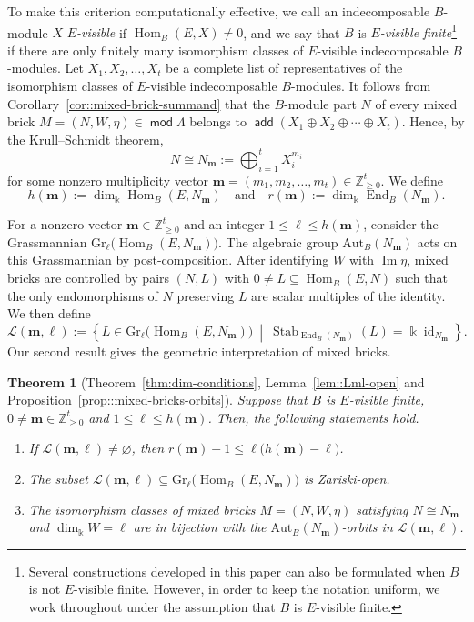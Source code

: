 \documentclass[a4,12pt]{amsart}
\numberwithin{equation}{section} %
\def\Hom{\operatorname{Hom}} %
\def\End{\operatorname{End}} %
\def\Im{\operatorname{Im}} %
\def\Stab{\operatorname{Stab}} %
\def\add{\operatorname{\mathsf{add}}}
\def\mod{\operatorname{\mathsf{mod}}}
\def\Gr{\mathrm{Gr}} %
\def\Aut{\mathrm{Aut}} %
\newtheorem{theorem*}{Theorem} %
\theoremstyle{definition} %
\begin{document}
To make this criterion computationally effective, we call an indecomposable $B$-module $X$ \emph{$E$-visible} if $\Hom_B(E,X)\neq0$, and we say that $B$ is \emph{$E$-visible finite}\footnote{Several constructions developed in this paper can also be formulated when $B$ is not $E$-visible finite. However, in order to keep the notation uniform, we work throughout under the assumption that $B$ is $E$-visible finite.} if there are only finitely many isomorphism classes of $E$-visible indecomposable $B$-modules. Let $X_1,X_2,\ldots,X_t$ be a complete list of representatives of the isomorphism classes of $E$-visible indecomposable $B$-modules. It follows from Corollary~\ref{cor::mixed-brick-summand} that the $B$-module part $N$ of every mixed brick $M=(N,W,\eta)\in\mod \Lambda$ belongs to $\add(X_1\oplus X_2\oplus\cdots\oplus X_t)$. Hence, by the Krull--Schmidt theorem, 
\[
N\cong N_{\mathbf{m}} := \bigoplus_{i=1}^tX_i^{m_i}
\]
for some nonzero multiplicity vector $\mathbf{m}=(m_1,m_2,\ldots,m_t)\in\mathbb{Z}_{\geq 0}^t$. We define 
\[
h(\mathbf{m}) :=\dim_{\Bbbk}\Hom_B(E,N_{\mathbf{m}})\quad \text{and} \quad r(\mathbf{m}) := \dim_{\Bbbk}\End_B(N_{\mathbf{m}}).
\]

For a nonzero vector $\mathbf{m}\in\mathbb{Z}_{\geq 0}^t$ and an integer $1\leq\ell\leq h(\mathbf{m})$, consider the Grassmannian $\Gr_\ell\bigl(\Hom_B(E,N_{\mathbf{m}})\bigr)$. The algebraic group $\Aut_B(N_{\mathbf{m}})$ acts on this Grassmannian by post-composition. After identifying $W$ with $\Im\eta$, mixed bricks are controlled by pairs $(N,L)$ with $0\neq L\subseteq\Hom_B(E,N)$ such that the only endomorphisms of $N$ preserving $L$ are scalar multiples of the identity. We then define
\[
\mathcal{L}(\mathbf{m},\ell)
:=
\left\{
L\in\Gr_\ell\bigl(\Hom_B(E,N_{\mathbf{m}})\bigr)
\ \middle|\
\Stab_{\End_B(N_{\mathbf{m}})}(L)
=
\Bbbk\operatorname{id}_{N_{\mathbf{m}}}
\right\}.
\]
Our second result gives the geometric interpretation of mixed bricks.

\begin{theorem*}[Theorem~\ref{thm:dim-conditions}, Lemma~\ref{lem::Lml-open} and Proposition~\ref{prop::mixed-bricks-orbits}]
Suppose that $B$ is $E$-visible finite, $0\neq\mathbf{m}\in\mathbb{Z}_{\geq 0}^t$ and $1\leq\ell\leq h(\mathbf{m})$. Then, the following statements hold.
\begin{enumerate}

\item If $\mathcal{L}(\mathbf{m},\ell)\neq\varnothing$, then $r(\mathbf{m})-1
\leq
\ell\bigl(h(\mathbf{m})-\ell\bigr)$. 

\item The subset $\mathcal{L}(\mathbf{m},\ell) \subseteq \Gr_\ell\bigl(\Hom_B(E,N_{\mathbf{m}})\bigr)$ is Zariski-open.

\item The isomorphism classes of mixed bricks $M=(N,W,\eta)$ satisfying $N\cong N_{\mathbf{m}}$ and $\dim_{\Bbbk}W=\ell$ are in bijection with the $\Aut_B(N_{\mathbf{m}})$-orbits in $\mathcal{L}(\mathbf{m},\ell)$.
\end{enumerate}
\end{theorem*}
\end{document}
